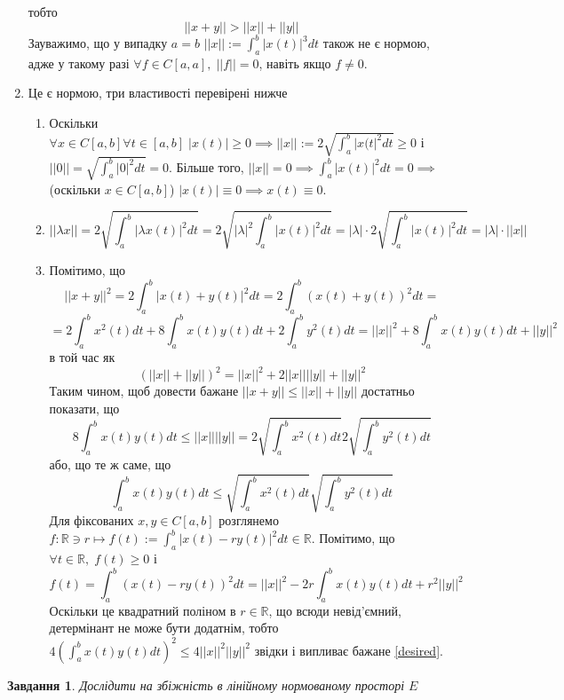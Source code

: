\documentclass[12pt]{article} %
\newcommand{\mynorm}[1]{\left|\left|#1\right|\right|}
\newcommand{\myabs}[1]{\left|#1\right|}
\newtheorem{prob}{Завдання}
\begin{document}
\begin{enumerate}
{		тобто
		\[\mynorm{x+y}>\mynorm{x}+\mynorm{y}\]
		Зауважимо, що у випадку $a=b$ $\mynorm{x}:=\int_a^b\myabs{x(t)}^3dt$ також не є нормою, адже у такому разі $\forall f\in
		C[a,a],\;\mynorm{f}=0$, навіть якщо $f\neq 0$.
		}
	\item{Це є нормою, три властивості перевірені нижче
			\begin{enumerate}[label=(\arabic*)]
				\item{Оскільки $\forall x\in C[a,b]\forall t\in[a,b]\;\myabs{x(t)}\geq0\implies
					\mynorm{x}:=2\sqrt{\int_a^b\myabs{x(t}^2dt}\geq 0$ і $\mynorm{0}=\sqrt{\int_a^b\myabs{0}^2dt}=0$.
					Більше того, 
					$\mynorm{x}=0\implies\int_a^b\myabs{x(t)}^2dt=0\implies $ (оскільки $x\in C[a,b]$) 
					$\myabs{x(t)}\equiv 0\implies
					x(t)\equiv 0$.
					}
				\item{
					\newcommand{\mymax}[1]{2\sqrt{\int_a^b {#1}^2 dt}}
					\[\mynorm{\lambda x}=\mymax{\myabs{\lambda x(t)}}=
					2\sqrt{\myabs{\lambda}^2\int_a^b {\myabs{x(t)}^2 dt}}=
					\myabs{\lambda}\cdot\mymax{ \myabs{x(t)}}=
					\myabs{\lambda}\cdot\mynorm{x}\]}
				\item{
					\newcommand{\mymax}[1]{2\sqrt{\int_a^b {#1} dt}}
					\newcommand{\mymaxo}[1]{\sqrt{\int_a^b {#1} dt}}
					\newcommand{\mymaxwo}[1]{2{\int_a^b {#1}^2 dt}}
					Помітимо, що
					\[\mynorm{x+y}^2=
					\mymaxwo{\myabs{x(t)+y(t)}}=
					\mymaxwo{(x(t)+y(t))}=\]\[
					=2\int_a^b x^2(t)dt+8\int_a^b x(t)y(t)dt+2\int_a^by^2(t)dt=
					\mynorm{x}^2+8\int_a^bx(t)y(t)dt+\mynorm{y}^2
					\]
					в той час як
					\[(\mynorm{x}+\mynorm{y})^2=
					\mynorm{x}^2+2\mynorm{x}\mynorm{y}+\mynorm{y}^2\]
					Таким чином, щоб довести бажане $\mynorm{x+y}\leq\mynorm{x}+\mynorm{y}$
					достатньо показати, що
					\[8\int_a^bx(t)y(t)dt\leq\mynorm{x}\mynorm{y}=\mymax{x^2(t)}\mymax{y^2(t)}\]
					або, що те ж саме, що
					\[\int_a^bx(t)y(t)dt\leq\mymaxo{x^2(t)}\mymaxo{y^2(t)}\tag{*}\label{desired}\]
					Для фіксованих $x,y\in C[a,b]$ розглянемо $f:\mathbb{R}\ni r\mapsto f(t):=\int_a^b \myabs{x(t)-r
					y(t)}^2dt\in\mathbb{R}$. Помітимо, що $\forall t\in\mathbb{R},\;f(t)\geq0$ і 
					\[f(t)=\int_a^b (x(t)-ry(t))^2dt=\mynorm{x}^2-2r\int_a^b x(t)y(t)dt+r^2\mynorm{y}^2\]
					Оскільки це квадратний поліном в $r\in\mathbb{R}$, що всюди невід’ємний, детермінант не може
					бути додатнім, тобто
					$4\left(\int_a^b x(t)y(t)dt\right)^2\leq 4\mynorm{x}^2\mynorm{y}^2$
					звідки і випливає бажане \ref{desired}.
					}
			\end{enumerate}
		}
	\end{enumerate}
\begin{prob}
	Дослідити на збіжність в лінійному нормованому просторі $E$
\end{prob}
\end{document}
